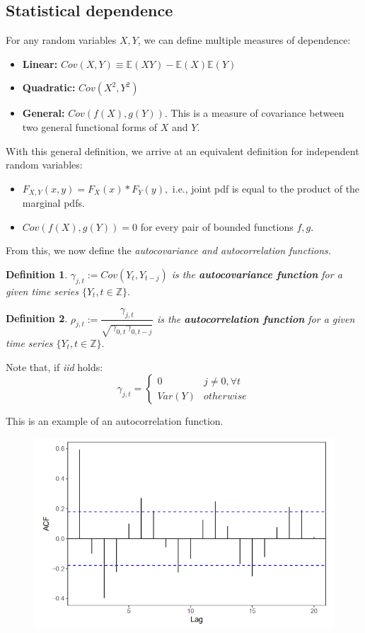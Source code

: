 \documentclass[11pt, a4paper]{report}
\theoremstyle{plain}
\theoremstyle{plain}
\newtheorem{defn}{Definition}[section]
\theoremstyle{remark}
\begin{document}
\subsection{Statistical dependence}

For any random variables $X, Y$, we can define multiple measures of dependence:
\begin{itemize}
	\item \textbf{Linear:} $Cov(X,Y) \equiv \mathbb{E}(XY) - \mathbb{E}(X)\mathbb{E}(Y) $
	\item \textbf{Quadratic:} $Cov(X^2, Y^2)$
	\item \textbf{General:} $Cov(f(X), g(Y))$. This is a measure of covariance between two general functional forms of $X$ and $Y$.
\end{itemize}
With this general definition, we arrive at an equivalent definition for independent random variables:
\begin{itemize}
	\item $F_{X,Y}(x,y) = F_X(x) * F_Y(y),$ i.e., joint pdf is equal to the product of the marginal pdfs.
	\item $Cov(f(X), g(Y)) = 0$ for every pair of bounded functions $f, g$.
\end{itemize}

From this, we now define the \textit{autocovariance and autocorrelation functions.}

\begin{defn}
	$\gamma_{j,t} := Cov(Y_t, Y_{t-j})$ is the \textbf{autocovariance function} for a given time series $\{Y_t, t \in \mathbb{Z} \}.$
\end{defn}

\begin{defn}
	$\rho_{j,t} := \dfrac{\gamma_{j,t}}{\sqrt{\gamma_{0,t}\gamma_{0,t-j}}}$ is the \textbf{autocorrelation function} for a given time series $\{Y_t, t \in \mathbb{Z} \}.$
\end{defn}

Note that, if \textit{iid} holds:
$$ \gamma_{j,t} = \begin{cases}
	0 & j \neq 0, \forall t \\
	Var(Y) & otherwise 
\end{cases} $$

This is an example of an autocorrelation function.

\begin{figure}[h!]
	\centering
	\includegraphics[width=0.6\linewidth]{"acf example"}
	\label{fig:acf-example}
\end{figure}
\end{document}
